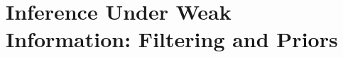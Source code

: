 %
\renewcommand{\figdir}{figures/ch10}
\chapter[Inference under weak information: filtering and priors]{Inference
  Under Weak Information: Filtering and Priors}
\label{ch:infer}

